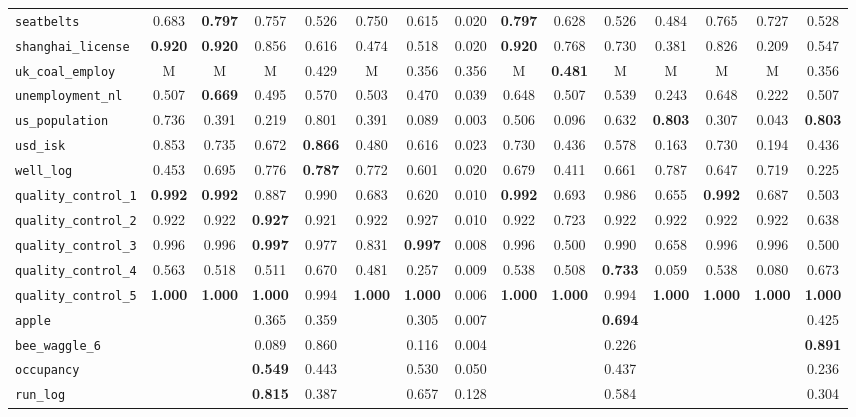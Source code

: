 \begin{tabular}{lcccccccccccccc}
\verb+seatbelts+ & 0.683 & \textbf{0.797} & 0.757 & 0.526 & 0.750 & 0.615 & 0.020 & \textbf{0.797} & 0.628 & 0.526 & 0.484 & 0.765 & 0.727 & 0.528\\
\verb+shanghai_license+ & \textbf{0.920} & \textbf{0.920} & 0.856 & 0.616 & 0.474 & 0.518 & 0.020 & \textbf{0.920} & 0.768 & 0.730 & 0.381 & 0.826 & 0.209 & 0.547\\
\verb+uk_coal_employ+ & M & M & M & 0.429 & M & 0.356 & 0.356 & M & \textbf{0.481} & M & M & M & M & 0.356\\
\verb+unemployment_nl+ & 0.507 & \textbf{0.669} & 0.495 & 0.570 & 0.503 & 0.470 & 0.039 & 0.648 & 0.507 & 0.539 & 0.243 & 0.648 & 0.222 & 0.507\\
\verb+us_population+ & 0.736 & 0.391 & 0.219 & 0.801 & 0.391 & 0.089 & 0.003 & 0.506 & 0.096 & 0.632 & \textbf{0.803} & 0.307 & 0.043 & \textbf{0.803}\\
\verb+usd_isk+ & 0.853 & 0.735 & 0.672 & \textbf{0.866} & 0.480 & 0.616 & 0.023 & 0.730 & 0.436 & 0.578 & 0.163 & 0.730 & 0.194 & 0.436\\
\verb+well_log+ & 0.453 & 0.695 & 0.776 & \textbf{0.787} & 0.772 & 0.601 & 0.020 & 0.679 & 0.411 & 0.661 & 0.787 & 0.647 & 0.719 & 0.225\\
\midrule
\verb+quality_control_1+ & \textbf{0.992} & \textbf{0.992} & 0.887 & 0.990 & 0.683 & 0.620 & 0.010 & \textbf{0.992} & 0.693 & 0.986 & 0.655 & \textbf{0.992} & 0.687 & 0.503\\
\verb+quality_control_2+ & 0.922 & 0.922 & \textbf{0.927} & 0.921 & 0.922 & 0.927 & 0.010 & 0.922 & 0.723 & 0.922 & 0.922 & 0.922 & 0.922 & 0.638\\
\verb+quality_control_3+ & 0.996 & 0.996 & \textbf{0.997} & 0.977 & 0.831 & \textbf{0.997} & 0.008 & 0.996 & 0.500 & 0.990 & 0.658 & 0.996 & 0.996 & 0.500\\
\verb+quality_control_4+ & 0.563 & 0.518 & 0.511 & 0.670 & 0.481 & 0.257 & 0.009 & 0.538 & 0.508 & \textbf{0.733} & 0.059 & 0.538 & 0.080 & 0.673\\
\verb+quality_control_5+ & \textbf{1.000} & \textbf{1.000} & \textbf{1.000} & 0.994 & \textbf{1.000} & \textbf{1.000} & 0.006 & \textbf{1.000} & \textbf{1.000} & 0.994 & \textbf{1.000} & \textbf{1.000} & \textbf{1.000} & \textbf{1.000}\\
\midrule
\verb+apple+ &  &  & 0.365 & 0.359 &  & 0.305 & 0.007 &  &  & \textbf{0.694} &  &  &  & 0.425\\
\verb+bee_waggle_6+ &  &  & 0.089 & 0.860 &  & 0.116 & 0.004 &  &  & 0.226 &  &  &  & \textbf{0.891}\\
\verb+occupancy+ &  &  & \textbf{0.549} & 0.443 &  & 0.530 & 0.050 &  &  & 0.437 &  &  &  & 0.236\\
\verb+run_log+ &  &  & \textbf{0.815} & 0.387 &  & 0.657 & 0.128 &  &  & 0.584 &  &  &  & 0.304\\
\bottomrule
\end{tabular}

